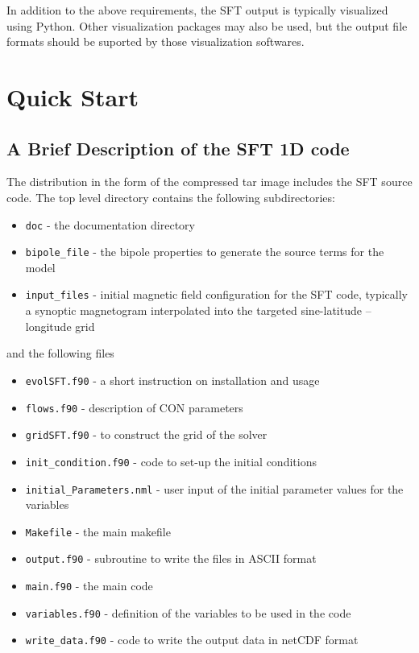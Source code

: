 In addition to the above requirements, the SFT output is typically
visualized using Python. Other visualization packages may also be used, but the output file formats should be suported by those visualization softwares.

\chapter{Quick Start}

\section{A Brief Description of the SFT 1D code}

The distribution in the form of the compressed tar image
includes the SFT source code.
The top level directory contains the following subdirectories:
\begin{itemize}\itemsep=0pt
\item {\tt doc}     - the documentation directory 
\item {\tt bipole\_file} - the bipole properties to generate the source terms for the model
\item {\tt input\_files}  - initial magnetic field configuration for the SFT code, typically a synoptic magnetogram interpolated into the targeted sine-latitude -- longitude grid 
\end{itemize}
and the following files
\begin{itemize}\itemsep=0pt
\item {\tt evolSFT.f90}     - a short instruction on installation and usage
\item {\tt flows.f90}     - description of CON parameters
\item {\tt grid\-SFT.f90}   - to construct the grid of the solver
\item {\tt init\_condition.f90} - code to set-up the initial conditions
\item {\tt initial\_Parameters.nml} - user input of the initial parameter values for the variables
\item {\tt Makefile}      - the main makefile
\item {\tt output.f90}  - subroutine to write the files in ASCII format
\item {\tt main.f90} - the main code
\item {\tt variables.f90} - definition of the variables to be used in the code
\item {\tt write\_data.f90} - code to write the output data in netCDF format
\end{itemize}


